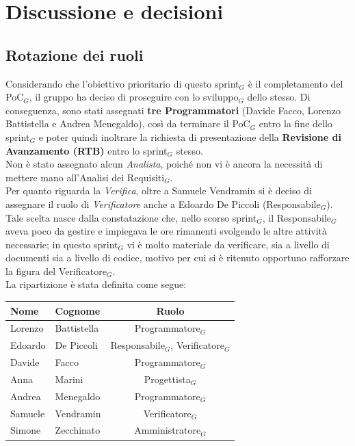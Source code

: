 \documentclass[a4paper, 10pt, colorlinks=true, linkcolor=black, urlcolor=blue, citecolor=blue, hidelinks]{article}
\begin{document}
\section{Discussione e decisioni}

\subsection{Rotazione dei ruoli}
Considerando che l'obiettivo prioritario di questo sprint$_G$ è il completamento del PoC$_G$, il gruppo ha deciso di proseguire con lo sviluppo$_G$ dello stesso. Di conseguenza, sono stati assegnati \textbf{tre Programmatori} (Davide Facco, Lorenzo Battistella e Andrea Menegaldo), così da terminare il PoC$_G$ entro la fine dello sprint$_G$ e poter quindi inoltrare la richiesta di presentazione della \textbf{Revisione di Avanzamento (RTB)} entro lo sprint$_G$ stesso.\\
Non è stato assegnato alcun \textit{Analista}, poiché non vi è ancora la necessità di mettere mano all'Analisi dei Requisiti$_G$.\\
Per quanto riguarda la \textit{Verifica}, oltre a Samuele Vendramin si è deciso di assegnare il ruolo di \textit{Verificatore} anche a Edoardo De Piccoli (Responsabile$_G$). Tale scelta nasce dalla constatazione che, nello scorso sprint$_G$, il Responsabile$_G$ aveva poco da gestire e impiegava le ore rimanenti svolgendo le altre attività necessarie; in questo sprint$_G$ vi è molto materiale da verificare, sia a livello di documenti sia a livello di codice, motivo per cui si è ritenuto opportuno rafforzare la figura del Verificatore$_G$.\\
La ripartizione è stata definita come segue:
\begin{center}
    \begin{tabular}{|l|l|c|}
        \hline
        \textbf{Nome} & \textbf{Cognome} & \textbf{Ruolo} \\
        \hline
        Lorenzo & Battistella & Programmatore$_G$ \\
        \hline
        Edoardo & De Piccoli & Responsabile$_G$, Verificatore$_G$ \\
        \hline
        Davide & Facco & Programmatore$_G$ \\
        \hline
        Anna & Marini & Progettista$_G$ \\
        \hline
        Andrea & Menegaldo & Programmatore$_G$ \\
        \hline
        Samuele & Vendramin & Verificatore$_G$ \\
        \hline
        Simone & Zecchinato & Amministratore$_G$ \\
        \hline
    \end{tabular}
\end{center}
\end{document}
